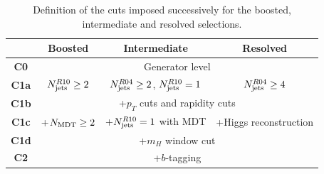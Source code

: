 \begin{table}[t]
  \centering
  \begin{tabular}{|c|c|c|c|}
\hline
&  Boosted  &   Intermediate &  Resolved  \\
\hline
\hline
{\bf C0} &  \multicolumn{3}{c|}{Generator level} \\
\hline
{\bf C1a} & $N_{\rm jets}^{R10}\ge 2$ & $N_{\rm jets}^{R04}\ge 2$, $N_{\rm jets}^{R10}=1$  &
$N_{\rm jets}^{R04}\ge 4$ \\
\hline
{\bf  C1b} & \multicolumn{3}{c|}{+$p_T$ cuts and rapidity cuts} \\
\hline
 {\bf C1c} & +$N_{\rm MDT}\ge 2$ & +$N_{\rm jets}^{R10}=1$ with MDT  &
 +Higgs reconstruction \\
 \hline
{\bf C1d} & \multicolumn{3}{c|}{ +$m_H$ window cut} \\
\hline
{\bf C2} & \multicolumn{3}{c|}{+$b$-tagging}    \\
\hline
  \end{tabular}
  \caption{\small Definition of the cuts imposed successively for the boosted, intermediate
    and resolved selections.
      \label{tab:cutflowdetails}
  }
\end{table}


